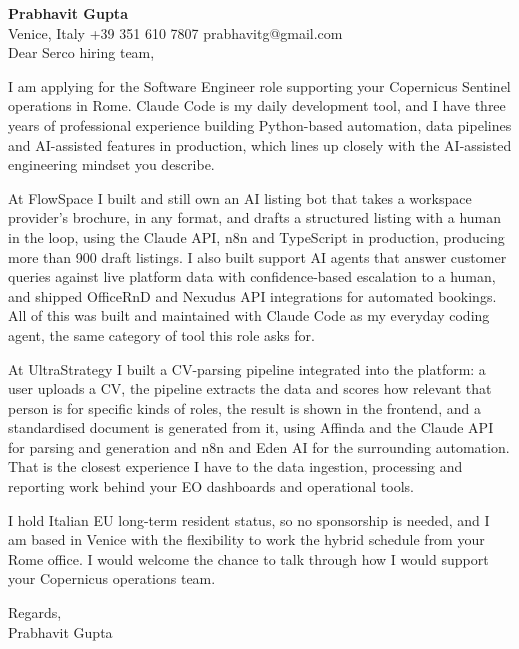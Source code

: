 \documentclass[a4paper,10.5pt]{article}
\begin{document}
\textbf{Prabhavit Gupta}\\
Venice, Italy \textbar{} +39 351 610 7807 \textbar{} prabhavitg@gmail.com\\[10pt]
Dear Serco hiring team,

I am applying for the Software Engineer role supporting your Copernicus Sentinel operations in Rome. Claude Code is my daily development tool, and I have three years of professional experience building Python-based automation, data pipelines and AI-assisted features in production, which lines up closely with the AI-assisted engineering mindset you describe.

At FlowSpace I built and still own an AI listing bot that takes a workspace provider's brochure, in any format, and drafts a structured listing with a human in the loop, using the Claude API, n8n and TypeScript in production, producing more than 900 draft listings. I also built support AI agents that answer customer queries against live platform data with confidence-based escalation to a human, and shipped OfficeRnD and Nexudus API integrations for automated bookings. All of this was built and maintained with Claude Code as my everyday coding agent, the same category of tool this role asks for.

At UltraStrategy I built a CV-parsing pipeline integrated into the platform: a user uploads a CV, the pipeline extracts the data and scores how relevant that person is for specific kinds of roles, the result is shown in the frontend, and a standardised document is generated from it, using Affinda and the Claude API for parsing and generation and n8n and Eden AI for the surrounding automation. That is the closest experience I have to the data ingestion, processing and reporting work behind your EO dashboards and operational tools.

I hold Italian EU long-term resident status, so no sponsorship is needed, and I am based in Venice with the flexibility to work the hybrid schedule from your Rome office. I would welcome the chance to talk through how I would support your Copernicus operations team.

Regards,\\
Prabhavit Gupta
\end{document}
